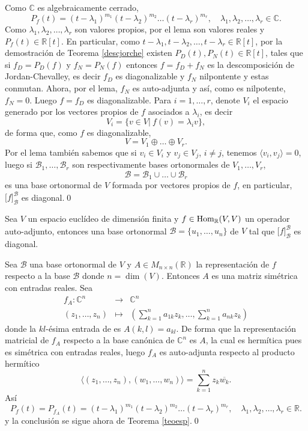 \dem Como $\mathbb{C}$ es algebraicamente cerrado,
\[
P_f(t)=(t-\lambda_1)^{m_1}(t-\lambda_2)^{m_2}\ldots(t-\lambda_r)^{m_r}, \quad \lambda_1,\lambda_2,\ldots,\lambda_r\in \mathbb{C}.
\]
Como $\lambda_1,\lambda_2,\ldots,\lambda_r$ son valores propios, por el lema son valores reales y $P_f(t)\in\mathbb{R}[t]$. En particular, como $t-\lambda_1,t-\lambda_2,\ldots,t-\lambda_r\in\mathbb{R}[t]$, por la demostraci\'on de Teorema \ref{descjorche} existen $P_D(t),P_N(t)\in\mathbb{R}[t]$, tales que si $f_D=P_D(f)$ y $f_N=P_N(f)$ entonces $f=f_D+f_N$ es la descomposici\'on de Jordan-Chevalley, es decir $f_D$ es diagonalizable y $f_N$ nilpontente y estas conmutan. Ahora, por el lema, $f_N$ es auto-adjunta y as\'i, como es nilpotente, $f_N=0$. Luego $f=f_D$ es diagonalizable. Para $i=1,\ldots,r$, denote $V_i$ el espacio generado por los vectores propios de $f$ asociados a $\lambda_i$, es decir
\[
V_i=\{v\in V|\ f(v)=\lambda_iv\},
\]
de forma que, como $f$ es diagonalizable,
\[
V=V_1\oplus\ldots\oplus V_r.
\]
Por el lema tambi\'en sabemos que si $v_i\in V_i$ y $v_j\in V_j$, $i\ne j$, tenemos $\langle v_i,v_j \rangle=0$, luego si $\mathcal{B}_1,\ldots,\mathcal{B}_r$ son respectivamente bases ortonormales de $V_1,\ldots,V_r$,
\[
\mathcal{B}=\mathcal{B}_1\cup\ldots\cup \mathcal{B}_r
\]
es una base ortonormal de $V$ formada por vectores propios de $f$, en particular, $\Big[f\Big]^\mathcal{B}_\mathcal{B}$ es diagonal.\qed

\begin{coro}
Sea $V$ un espacio eucl\'ideo de dimensi\'on finita y $f\in\operatorname{Hom}_{\mathbb{R}}(V,V)$ un operador auto-adjunto, entonces una base ortonormal $\mathcal{B}=\{u_1,\ldots,u_n\}$ de $V$ tal que $\Big[f\Big]^\mathcal{B}_\mathcal{B}$ es diagonal.
\end{coro}

\dem Sea $\mathcal{B}$ una base ortonormal de $V$ y $A\in M_{n\times n}(\mathbb{R})$ la representaci\'on de $f$ respecto a la base $\mathcal{B}$ donde $n=\dim(V)$. Entonces $A$ es una matriz sim\'etrica con entradas reales. Sea
\begin{eqnarray*}
f_A:\mathbb{C}^n & \longrightarrow & \mathbb{C}^n\\
(z_1,\ldots,z_n) & \longmapsto & \left(\sum_{k=1}^na_{1k}z_k,\ldots,\sum_{k=1}^na_{nk}z_k\right)
\end{eqnarray*}
donde la $kl$-\'esima entrada de es $A(k,l)=a_{kl}$. De forma que la representaci\'on matricial de $f_A$ respecto a la base can\'onica de $\mathbb{C}^n$ es $A$, la cual es herm\'itica pues es sim\'etrica con entradas reales, luego $f_A$ es auto-adjunta respecto al producto herm\'itico
\[
\langle (z_1,\ldots,z_n),(w_1,\ldots,w_n)\rangle =\sum_{k=1}^nz_k\overline{w_k}.
\]
As\'i
\[
P_f(t)=P_{f_A}(t)=(t-\lambda_1)^{m_1}(t-\lambda_2)^{m_2}\ldots(t-\lambda_r)^{m_r}, \quad \lambda_1,\lambda_2,\ldots,\lambda_r\in \mathbb{R}.
\]
y la conclusi\'on se sigue ahora de Teorema \ref{teoesp}.\qed

